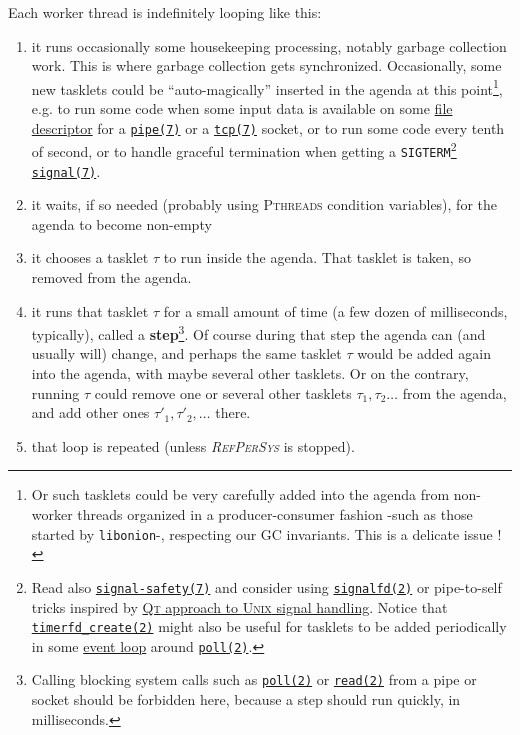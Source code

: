 \documentclass[11pt,a4paper,svgnames]{article}
\newcommand{\RefPerSys}{{\textit{\textsc{RefPerSys}}}}
\begin{document}
Each worker thread is indefinitely looping like this:
\begin{enumerate}
\item it runs occasionally some housekeeping processing, notably
  garbage collection work. This is where garbage collection gets
  synchronized. Occasionally, some new tasklets could be
  ``auto-magically'' inserted in the agenda at this point\footnote{Or
  such tasklets could be very carefully added into the agenda from
  non-worker threads organized in a producer-consumer fashion -such as
  those started by \texttt{libonion}-, respecting our GC
  invariants. This is a delicate issue !}, e.g. to run some code when
  some input data is available on some
  \href{https://en.wikipedia.org/wiki/File_descriptor}{file
    descriptor} for a
  \href{http://man7.org/linux/man-pages/man7/pipe.7.html}{\texttt{pipe(7)}}
  or a
  \href{http://man7.org/linux/man-pages/man7/tcp.7.html}{\texttt{tcp(7)}}
  socket, or to run some code every tenth of second, or to handle
  graceful termination when getting a \texttt{SIGTERM}\footnote{Read
  also
  \href{http://man7.org/linux/man-pages/man7/signal-safety.7.html}{\texttt{signal-safety(7)}}
  and consider using
  \href{http://man7.org/linux/man-pages/man2/signalfd.2.html}{\texttt{signalfd(2)}}
  or pipe-to-self tricks inspired by
  \href{https://doc.qt.io/qt-5/unix-signals.html}{\textsc{Qt} approach
    to \textsc{Unix} signal handling}. Notice that
  \href{http://man7.org/linux/man-pages/man2/timerfd\_create.2.html}{\texttt{timerfd\_create(2)}}
  might also be useful for tasklets to be added periodically in some
  \href{https://en.wikipedia.org/wiki/Event_loop}{event loop} around
  \href{http://man7.org/linux/man-pages/man2/poll.2.html}{\texttt{poll(2)}}.}
  \href{http://man7.org/linux/man-pages/man7/signal.7.html}{\texttt{signal(7)}}.
\item it waits, if so needed (probably using \textsc{Pthreads}
  condition variables), for the agenda to become non-empty
\item it chooses a tasklet $\tau$ to run inside the agenda. That
  tasklet is taken, so removed from the agenda.
\item it runs that tasklet $\tau$ for a small amount of time (a few
  dozen of milliseconds, typically), called a
  \textbf{step}\footnote{Calling blocking system calls such as
  \href{http://man7.org/linux/man-pages/man2/poll.2.html}{\texttt{poll(2)}}
  or
  \href{http://man7.org/linux/man-pages/man2/read.2.html}{\texttt{read(2)}}
  from a pipe or socket should be forbidden here, because a step
  should run quickly, in milliseconds.}. Of course during that step
  the agenda can (and usually will) change, and perhaps the same
  tasklet $\tau$ would be added again into the agenda, with maybe
  several other tasklets. Or on the contrary, running $\tau$ could
  remove one or several other tasklets $\tau_1, \tau_2 \ldots$ from
  the agenda, and add other ones $\tau'_1, \tau'_2, \ldots$ there.
\item that loop is repeated (unless {\RefPerSys} is stopped).
\end{enumerate}
\end{document}
